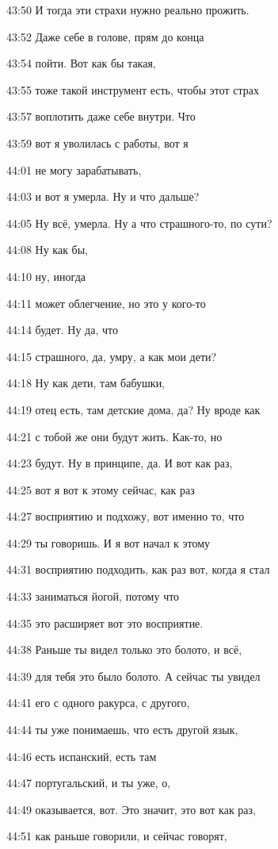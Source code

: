 43:50
И тогда эти страхи нужно реально прожить.

43:52
Даже себе в голове, прям до конца

43:54
пойти. Вот как бы такая,

43:55
тоже такой инструмент есть, чтобы этот страх

43:57
воплотить даже себе внутри. Что

43:59
вот я уволилась с работы, вот я

44:01
не могу зарабатывать,

44:03
и вот я умерла. Ну и что дальше?

44:05
Ну всё, умерла. Ну а что страшного-то, по сути?

44:08
Ну как бы,

44:10
ну, иногда

44:11
может облегчение, но это у кого-то

44:14
будет. Ну да, что

44:15
страшного, да, умру, а как мои дети?

44:18
Ну как дети, там бабушки,

44:19
отец есть, там детские дома, да? Ну вроде как

44:21
с тобой же они будут жить. Как-то, но

44:23
будут. Ну в принципе, да. И вот как раз,

44:25
вот я вот к этому сейчас, как раз

44:27
восприятию и подхожу, вот именно то, что

44:29
ты говоришь. И я вот начал к этому

44:31
восприятию подходить, как раз вот, когда я стал

44:33
заниматься йогой, потому что

44:35
это расширяет вот это восприятие.

44:38
Раньше ты видел только это болото, и всё,

44:39
для тебя это было болото. А сейчас ты увидел

44:41
его с одного ракурса, с другого,

44:44
ты уже понимаешь, что есть другой язык,

44:46
есть испанский, есть там

44:47
португальский, и ты уже, о,

44:49
оказывается, вот. Это значит, это вот как раз,

44:51
как раньше говорили, и сейчас говорят,

